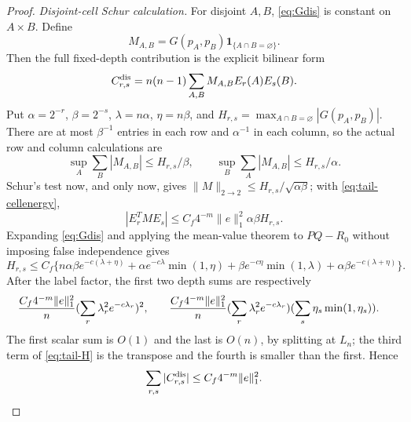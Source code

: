 \documentclass[11pt]{article}
\numberwithin{equation}{section}
\newcommand{\1}{\mathbf 1}\newcommand{\F}{\mathcal F}\newcommand{\D}{\mathcal D}
\newcommand{\norm}[1]{\lVert#1\rVert}
\begin{document}
\begin{proof}
\emph{Disjoint-cell Schur calculation.}
For disjoint $A,B$, \eqref{eq:Gdis} is constant on $A\times B$.  Define
\[
 M_{A,B}=G(p_A,p_B)\1_{\{A\cap B=\varnothing\}}.
\]
Then the full fixed-depth contribution is the explicit bilinear form
\begin{equation}\label{eq:tail-schur-form}
 C^{\rm dis}_{r,s}=n(n-1)\sum_{A,B}M_{A,B}E_r(A)E_s(B).
\end{equation}
Put $\alpha=2^{-r}$, $\beta=2^{-s}$,
$\lambda=n\alpha$, $\eta=n\beta$, and
$H_{r,s}=\max_{A\cap B=\varnothing}|G(p_A,p_B)|$.
There are at most $\beta^{-1}$ entries in each row and $\alpha^{-1}$ in
each column, so the actual row and column calculations are
\begin{equation}\label{eq:tail-schur-rows}
 \sup_A\sum_B|M_{A,B}|\le H_{r,s}/\beta,\qquad
 \sup_B\sum_A|M_{A,B}|\le H_{r,s}/\alpha.
\end{equation}
Schur's test now, and only now, gives
$\norm M_{2\to2}\le H_{r,s}/\sqrt{\alpha\beta}$; with
\eqref{eq:tail-cellenergy},
\begin{equation}\label{eq:tail-schur-applied}
 |E_r^TME_s|\le C_f4^{-m}\norm e_1^2\alpha\beta H_{r,s}.
\end{equation}
Expanding \eqref{eq:Gdis} and applying the mean-value theorem to $PQ-R_0$
without imposing false independence gives
\begin{equation}\label{eq:tail-H}
 H_{r,s}\le C_f\{n\alpha\beta e^{-c(\lambda+\eta)}
 +\alpha e^{-c\lambda}\min(1,\eta)
 +\beta e^{-c\eta}\min(1,\lambda)
 +\alpha\beta e^{-c(\lambda+\eta)}\}.
\end{equation}
After the label factor, the first two depth sums are respectively
\begin{align*}
 {C_f4^{-m}\norm e_1^2\over n}
 (\sum_r\lambda_r^2e^{-c\lambda_r})^2,&\qquad
 {C_f4^{-m}\norm e_1^2\over n}
 (\sum_r\lambda_r^2e^{-c\lambda_r})
 (\sum_s\eta_s\min(1,\eta_s)).
\end{align*}
The first scalar sum is $O(1)$ and the last is $O(n)$, by splitting at
$L_n$; the third term of \eqref{eq:tail-H} is the transpose and the fourth
is smaller than the first.  Hence
\begin{equation}\label{eq:tail-disjoint-total}
 \sum_{r,s}|C^{\rm dis}_{r,s}|\le C_f4^{-m}\norm e_1^2.
\end{equation}


\end{proof}
\end{document}
